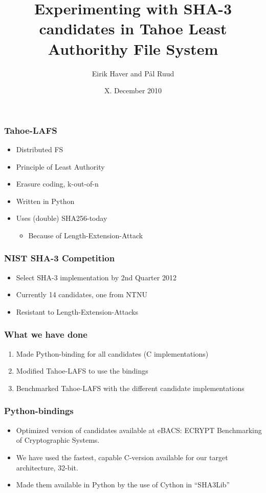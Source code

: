 \documentclass[screen]{beamer}
\title[SHA-3 in Tahoe-LAFS]%
{Experimenting with SHA-3 candidates in Tahoe Least Authorithy File System}
\author[EH \& PR]{Eirik Haver and Pål Ruud}
\institute[NTNU]{Department of Telematics}
\date{X. December 2010}
\begin{document}
\ntnutitlepage

\begin{frame}
  \frametitle{Tahoe-LAFS}
  \begin{itemize}
  \item Distributed FS
  \item Principle of Least Authority
  \item Erasure coding, k-out-of-n
  \item Written in Python
  \item Uses (double) SHA256-today
    \begin{itemize}
        \item Because of Length-Extension-Attack
    \end{itemize}
  \end{itemize}
\end{frame}

\begin{frame}
  \frametitle{NIST SHA-3 Competition}
  \begin{itemize}
  \item Select SHA-3 implementation by 2nd Quarter 2012
  \item Currently 14 candidates, one from NTNU
  \item Resistant to Length-Extension-Attacks
  \end{itemize}
\end{frame}

\begin{frame}
  \frametitle{What we have done}
  \begin{enumerate}
  \item Made Python-binding for all candidates (C implementations) 
  \item Modified Tahoe-LAFS to use the bindings
  \item Benchmarked Tahoe-LAFS with the different candidate implementations
  \end{enumerate}
\end{frame}

\begin{frame}
  \frametitle{Python-bindings}
  \begin{itemize}
  \item Optimized version of candidates available at eBACS: ECRYPT Benchmarking
  of Cryptographic Systems.
  \item We have used the fastest, capable C-version available for our target
  architecture, 32-bit.
  \item Made them available in Python by the use of Cython in ``SHA3Lib''
  \end{itemize}
\end{frame}
\end{document}
